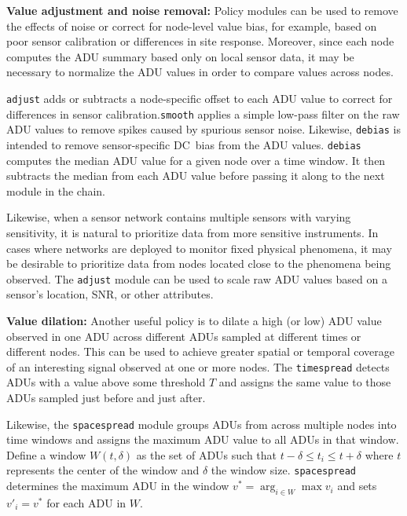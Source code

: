 {\bf Value adjustment and noise removal:} 
Policy modules can be used to remove the effects of noise or correct 
for node-level value bias, for example, based on poor sensor 
calibration or differences in site response. Moreover, since each node 
computes the ADU summary based only on local sensor data, it may be 
necessary to normalize the ADU values in order to compare 
values across nodes. 

{\tt adjust} adds or subtracts a node-specific offset to each ADU
value to correct for differences in sensor calibration.{\tt smooth}
applies a simple low-pass filter on the raw ADU values to remove
spikes caused by spurious sensor noise.
Likewise, {\tt debias} is intended to remove
sensor-specific DC~bias from the ADU values.
{\tt debias} computes the median ADU value for a given node over 
a time window. It then subtracts the median from each ADU value before 
passing it along to the next module in the chain. 

Likewise, when a sensor network contains
multiple sensors with varying sensitivity, it is natural to
prioritize data from more sensitive instruments. In cases where networks are
deployed to monitor fixed physical phenomena, it may be desirable to
prioritize data from nodes located close to the phenomena being
observed. The {\tt adjust} module can be used to scale
raw ADU values based on a sensor's location, SNR, or other attributes.

{\bf Value dilation:} 
Another useful policy is to dilate a high (or
low) ADU value observed in one ADU across different ADUs sampled
at different times or different nodes. This can be used to achieve
greater spatial or temporal coverage of an interesting signal
observed at one or more nodes. The {\tt timespread} detects ADUs with
a value above some threshold $T$ and 
assigns the same value to those ADUs sampled just before and just
after.

Likewise, the {\tt spacespread} module groups ADUs from across multiple
nodes into time windows and assigns the maximum ADU value to all
ADUs in that window.  Define a window $W(t,\delta)$ as the set of ADUs
such that $t-\delta \leq t_i \leq t+\delta$ where $t$ represents the
center of the window and $\delta$ the window size. {\tt spacespread}
determines the maximum ADU in the window $v^* = \arg_{i \in W} \max v_i$
and sets $v'_i = v^{*}$ for each ADU in $W$. 


